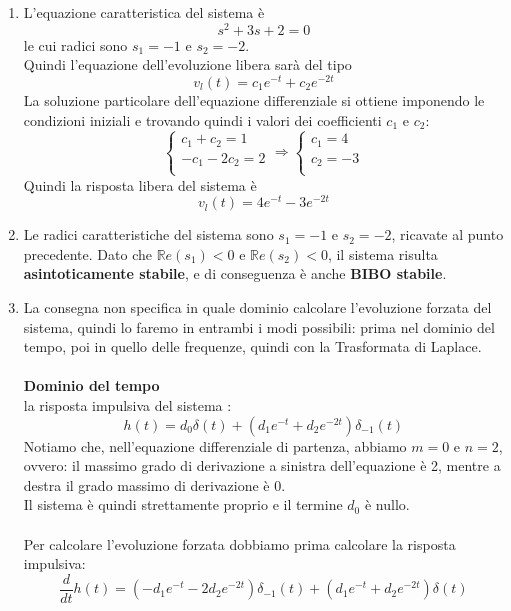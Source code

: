 \documentclass[12pt,a4paper]{article}
\begin{document}
	\begin{enumerate}
		\item L'equazione caratteristica del sistema è
		\[
			s^2 + 3s +2 = 0
		\]
		le cui radici sono $s_1 = -1$ e $s_2 = -2$.\\
		Quindi l'equazione dell'evoluzione libera sarà del tipo
		\[
			v_{l}(t) = c_{1}e^{-t} +  c_{2}e^{-2t}
		\]
		La soluzione particolare dell'equazione differenziale si ottiene imponendo le condizioni iniziali e trovando quindi i valori dei coefficienti $c_1$ e $c_2$:
		\[
			\begin{cases}
				c_{1} +  c_{2} = 1\\
				-c_{1}  -2 c_{2} = 2\\
			\end{cases}
			\Rightarrow
			\begin{cases}
				c_{1} = 4 \\
				c_{2} = -3 \\
			\end{cases}
		\]
		Quindi la risposta libera del sistema è
		\[
			v_{l}(t) =4e^{-t} -3e^{-2t}
		\]
		\item Le radici caratteristiche del sistema sono $s_1 = -1$ e $s_2 = -2$, ricavate al punto precedente.
		Dato che $\mathbb{R}e(s_1) < 0$ e $\mathbb{R}e(s_2) < 0$, il sistema risulta \textbf{asintoticamente stabile}, e di conseguenza è anche \textbf{BIBO stabile}.
		\item La consegna non specifica in quale dominio calcolare l'evoluzione forzata del sistema, quindi lo faremo in entrambi i modi possibili: prima nel dominio del tempo, poi in quello delle frequenze, quindi con la Trasformata di Laplace.\\ \\
		\textbf{Dominio del tempo}\\
		la risposta impulsiva del sistema : \\
		\[
			h(t) = d_{0}\delta(t) + ( d_{1}e^{-t} +  d_{2}e^{-2t}) \delta_{-1}(t)
		\]
		Notiamo che, nell'equazione differenziale di partenza, abbiamo $m = 0$ e $n = 2$, ovvero: il massimo grado di derivazione a sinistra dell'equazione è 2, mentre a destra il grado massimo di derivazione è 0.\\Il sistema è quindi strettamente proprio e il termine $d_0$ è nullo.\\ \\
		Per calcolare l'evoluzione forzata dobbiamo prima calcolare la risposta impulsiva:
		\[
			\frac{d}{dt} h(t) = (-d_{1}e^{-t} - 2d_{2}e^{-2t}) \delta_{-1}(t) + (d_{1}e^{-t} +  d_{2}e^{-2t}) \delta(t)
\]
\end{enumerate}
\end{document}
